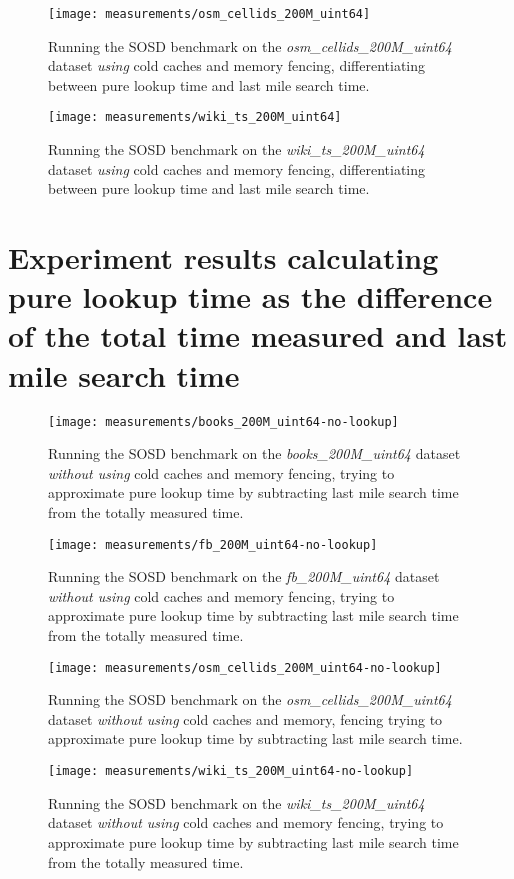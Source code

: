 \begin{figure}[!htb]
  \centering
  \texttt{[image: measurements/osm\_cellids\_200M\_uint64]}
  \caption*{
    Running the SOSD benchmark on the \emph{osm\_cellids\_200M\_uint64} dataset \emph{using} cold caches and memory fencing, differentiating between pure lookup time and last mile search time.
  }
\end{figure}

\begin{figure}[!htb]
  \centering
  \texttt{[image: measurements/wiki\_ts\_200M\_uint64]}
  \caption*{
    Running the SOSD benchmark on the \emph{wiki\_ts\_200M\_uint64} dataset \emph{using} cold caches and memory fencing, differentiating between pure lookup time and last mile search time.
  }
\end{figure}

\newpage %

\section{Experiment results calculating pure lookup time as the difference of the total time measured and last mile search time}
\label{sect:appendix:measurements-no-lookup}

\captionsetup[figure]{skip=10pt} %
\begin{figure}[!htb]
  \centering
  \texttt{[image: measurements/books\_200M\_uint64-no-lookup]}
  \caption*{
    Running the SOSD benchmark on the \emph{books\_200M\_uint64} dataset \emph{without using} cold caches and memory fencing, trying to approximate pure lookup time by subtracting last mile search time from the totally measured time.
  }
\end{figure}

\begin{figure}[!htb]
  \centering
  \texttt{[image: measurements/fb\_200M\_uint64-no-lookup]}
  \caption*{
    Running the SOSD benchmark on the \emph{fb\_200M\_uint64} dataset \emph{without using} cold caches and memory fencing, trying to approximate pure lookup time by subtracting last mile search time from the totally measured time.
  }
\end{figure}

\begin{figure}[!htb]
  \centering
  \texttt{[image: measurements/osm\_cellids\_200M\_uint64-no-lookup]}
  \caption*{
    Running the SOSD benchmark on the \emph{osm\_cellids\_200M\_uint64} dataset \emph{without using} cold caches and memory, fencing trying to approximate pure lookup time by subtracting last mile search time.
  }
\end{figure}

\begin{figure}[!htb]
  \centering
  \texttt{[image: measurements/wiki\_ts\_200M\_uint64-no-lookup]}
  \caption*{
    Running the SOSD benchmark on the \emph{wiki\_ts\_200M\_uint64} dataset \emph{without using} cold caches and memory fencing, trying to approximate pure lookup time by subtracting last mile search time from the totally measured time.
  }
\end{figure}
